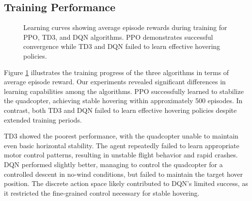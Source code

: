 \documentclass[12pt]{article}
\begin{document}
\subsection{Training Performance}

\begin{figure}[htbp]
\centering
\caption{Learning curves showing average episode rewards during training for PPO, TD3, and DQN algorithms. PPO demonstrates successful convergence while TD3 and DQN failed to learn effective hovering policies.}
\label{fig:learning_curves}
\end{figure}


Figure \ref{fig:learning_curves} illustrates the training progress of the three algorithms in terms of average episode reward. Our experiments revealed significant differences in learning capabilities among the algorithms. PPO successfully learned to stabilize the quadcopter, achieving stable hovering within approximately 500 episodes. In contrast, both TD3 and DQN failed to learn effective hovering policies despite extended training periods.


TD3 showed the poorest performance, with the quadcopter unable to maintain even basic horizontal stability. The agent repeatedly failed to learn appropriate motor control patterns, resulting in unstable flight behavior and rapid crashes. DQN performed slightly better, managing to control the quadcopter for a controlled descent in no-wind conditions, but failed to maintain the target hover position. The discrete action space likely contributed to DQN's limited success, as it restricted the fine-grained control necessary for stable hovering.

\end{document}
